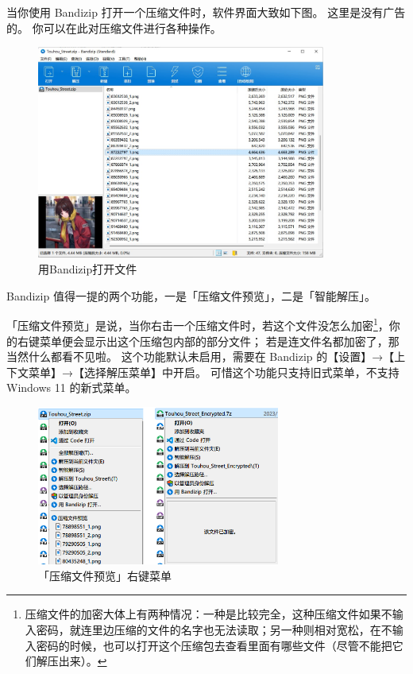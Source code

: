 当你使用 Bandizip 打开一个压缩文件时，软件界面大致如下图。
这里是没有广告的。
你可以在此对压缩文件进行各种操作。

\begin{figure}[htb!]
  \centering
  \includegraphics[width=9.5cm]{assets/Bandizip_View.jpg}
  \caption{用Bandizip打开文件}
  \label{Bandizip_View}
\end{figure}

Bandizip 值得一提的两个功能，一是「压缩文件预览」，二是「智能解压」。

「压缩文件预览」是说，当你右击一个压缩文件时，若这个文件没怎么加密\footnote{压缩文件的加密大体上有两种情况：一种是比较完全，这种压缩文件如果不输入密码，就连里边压缩的文件的名字也无法读取；另一种则相对宽松，在不输入密码的时候，也可以打开这个压缩包去查看里面有哪些文件（尽管不能把它们解压出来）。}，你的右键菜单便会显示出这个压缩包内部的部分文件；
若是连文件名都加密了，那当然什么都看不见啦。
这个功能默认未启用，需要在 Bandizip 的【设置】→【上下文菜单】→【选择解压菜单】中开启。
可惜这个功能只支持旧式菜单，不支持 Windows 11 的新式菜单。

\begin{figure}[htb!]
  \centering
  \includegraphics[width=8cm]{assets/Compressed_Preview.png}
  \caption{「压缩文件预览」右键菜单}
  \label{Compressed_Preview}
\end{figure}

